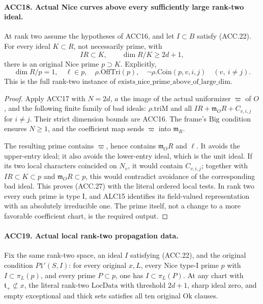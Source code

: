 \paragraph{ACC18. Actual Nice curves above every sufficiently large rank-two ideal.}
\label{claim:ACC18}
At rank two assume the hypotheses of ACC16, and let \(I\subset B\)
satisfy (ACC.22).  For every ideal \(K\subset R\), not necessarily
prime, with
\[
                       IR\subset K,\qquad \dim R/K\ge2d+1,
\]
there is an original Nice prime \(p\supset K\).  Explicitly,
\[
 \dim R/p=1,\quad \ell\in p,\quad
 \rho.\mathrm{OffTri}(p),\quad
 \neg\rho.\mathrm{Coin}(p,v,i,j)\quad(v,\ i\ne j).
                                                               \tag{ACC.27}
\]
This is the full rank-two instance of
\(\mathrm{exists\_nice\_prime\_above\_of\_large\_dim}\).

\begin{proof}
Apply ACC17 with \(N=2d\), \(a\) the image of the actual
uniformizer \(\varpi\) of \(O\), and the following finite
family of bad ideals: \(\rho.\mathrm{triM}\) and all
\(IR+\mathfrak m_O R+C_{v,i,j}\) for \(i\ne j\).
Their strict dimension bounds are ACC16.  The frame's \(\mathrm{Big}\)
condition ensures \(N\ge1\), and the coefficient map sends
\(\varpi\) into \(\mathfrak m_R\).

The resulting prime contains \(\varpi\), hence contains
\(\mathfrak m_O R\) and \(\ell\).  It avoids the upper-entry
ideal; it also avoids the lower-entry ideal, which is the unit
ideal.  If its two local characters coincided on \(N_v\), it
would contain \(C_{v,i,j}\); together with \(IR\subset K\subset p\)
and \(\mathfrak m_OR\subset p\), this would contradict avoidance
of the corresponding bad ideal.  This proves (ACC.27) with the
literal ordered local tests.  In rank two every such prime is
type I, and ALC15 identifies its field-valued representation with
an absolutely irreducible one.  The prime itself, not a change to
a more favorable coefficient chart, is the required output.
\end{proof}

\paragraph{ACC19. Actual local rank-two propagation data.}
\label{claim:ACC19}
Fix the same rank-two space, an ideal \(I\) satisfying (ACC.22),
and the original condition \(P1'(S,I)\): for every original
\(x,L\), every Nice type-I prime \(p\) with
\(I\subset\pi_L(p)\), and every prime \(P\subset p\),
one has \(I\subset\pi_L(P)\).  At any chart with
\(\mathfrak t_+\not\subset x\), the literal rank-two
\(\mathrm{LocData}\) with threshold \(2d+1\), sharp ideal
zero, and empty exceptional and thick sets satisfies all ten
original \(\mathrm{Ok}\) clauses.

